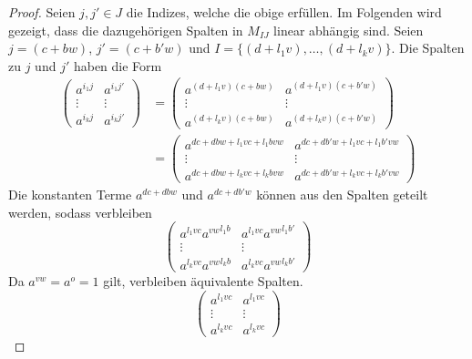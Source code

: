 {

\begin{proof}
    Seien $j,j' \in J$ die Indizes, welche die obige  erfüllen. Im Folgenden wird gezeigt, dass die dazugehörigen Spalten in $M_{IJ}$ linear abhängig sind. Seien $j = (c + bw)$, $j' = (c + b'w)$ und $I = \{(d+l_1v),\dots,(d+l_kv)\}$. Die Spalten zu $j$ und $j'$ haben die Form
    \begin{align*}
        \begin{pmatrix}
            a^{i_1j} & a^{i_1j'} \\
            \vdots & \vdots \\
            a^{i_kj} & a^{i_kj'}
        \end{pmatrix} &=
        \begin{pmatrix}
            a^{(d+l_1v)(c + bw)} & a^{(d+l_1v)(c + b'w)} \\
            \vdots & \vdots \\
            a^{(d+l_kv)(c + bw)} & a^{(d+l_kv)(c + b'w)}
        \end{pmatrix} \\
        &= \begin{pmatrix}
            a^{dc + dbw +l_1vc + l_1bvw} & a^{dc + db'w +l_1vc + l_1b'vw} \\
            \vdots & \vdots \\
            a^{dc + dbw +l_kvc + l_kbvw} & a^{dc + db'w +l_kvc + l_kb'vw}
        \end{pmatrix}
    \end{align*}
    Die konstanten Terme $a^{dc + dbw}$ und $a^{dc + db'w}$ können aus den Spalten geteilt werden, sodass verbleiben
    \begin{equation*}
        \begin{pmatrix}
            a^{l_1vc} {a^{vw}}^{l_1b} & a^{l_1vc} {a^{vw}}^{l_1b'} \\
            \vdots & \vdots \\
            a^{l_kvc} {a^{vw}}^{l_kb} & a^{l_kvc} {a^{vw}}^{l_kb'}
        \end{pmatrix}
    \end{equation*}
    Da $a^{vw} = a^{o} = 1$ gilt, verbleiben äquivalente Spalten.
    \begin{equation*}
        \begin{pmatrix}
            a^{l_1vc} & a^{l_1vc} \\
            \vdots & \vdots \\
            a^{l_kvc} & a^{l_kvc}
        \end{pmatrix}
    \end{equation*}


\end{proof}}
